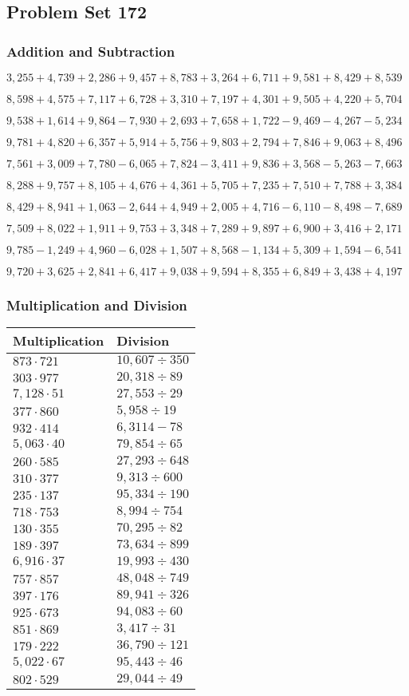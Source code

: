 \hypertarget{problem-set-172}{%
\subsection{Problem Set 172}\label{problem-set-172}}

\hypertarget{addition-and-subtraction}{%
\subsubsection{Addition and
Subtraction}\label{addition-and-subtraction}}

\(3,255+4,739+2,286+9,457+8,783+3,264+6,711+9,581+8,429+8,539\)

\(8,598+4,575+7,117+6,728+3,310+7,197+4,301+9,505+4,220+5,704\)

\(9,538+1,614+9,864-7,930+2,693+7,658+1,722-9,469-4,267-5,234\)

\(9,781+4,820+6,357+5,914+5,756+9,803+2,794+7,846+9,063+8,496\)

\(7,561+3,009+7,780-6,065+7,824-3,411+9,836+3,568-5,263-7,663\)

\(8,288+9,757+8,105+4,676+4,361+5,705+7,235+7,510+7,788+3,384\)

\(8,429+8,941+1,063-2,644+4,949+2,005+4,716-6,110-8,498-7,689\)

\(7,509+8,022+1,911+9,753+3,348+7,289+9,897+6,900+3,416+2,171\)

\(9,785-1,249+4,960-6,028+1,507+8,568-1,134+5,309+1,594-6,541\)

\(9,720+3,625+2,841+6,417+9,038+9,594+8,355+6,849+3,438+4,197\)

\hypertarget{multiplication-and-division}{%
\subsubsection{Multiplication and
Division}\label{multiplication-and-division}}

\begin{longtable}[]{@{}ll@{}}
\toprule
Multiplication & Division\tabularnewline
\midrule
\endhead
\(873\cdot721\) & \(10,607÷350\)\tabularnewline
\(303\cdot977\) & \(20,318÷89\)\tabularnewline
\(7,128\cdot51\) & \(27,553÷29\)\tabularnewline
\(377\cdot860\) & \(5,958÷19\)\tabularnewline
\(932\cdot414\) & \(6,311 4-78\)\tabularnewline
\(5,063\cdot40\) & \(79,854÷65\)\tabularnewline
\(260\cdot585\) & \(27,293÷648\)\tabularnewline
\(310\cdot377\) & \(9,313÷600\)\tabularnewline
\(235\cdot137\) & \(95,334÷190\)\tabularnewline
\(718\cdot753\) & \(8,994÷754\)\tabularnewline
\(130\cdot355\) & \(70,295÷82\)\tabularnewline
\(189\cdot397\) & \(73,634÷899\)\tabularnewline
\(6,916\cdot37\) & \(19,993÷430\)\tabularnewline
\(757\cdot857\) & \(48,048÷749\)\tabularnewline
\(397\cdot176\) & \(89,941÷326\)\tabularnewline
\(925\cdot673\) & \(94,083÷60\)\tabularnewline
\(851\cdot869\) & \(3,417÷31\)\tabularnewline
\(179\cdot222\) & \(36,790÷121\)\tabularnewline
\(5,022\cdot67\) & \(95,443÷46\)\tabularnewline
\(802\cdot529\) & \(29,044÷49\)\tabularnewline
\bottomrule
\end{longtable}
